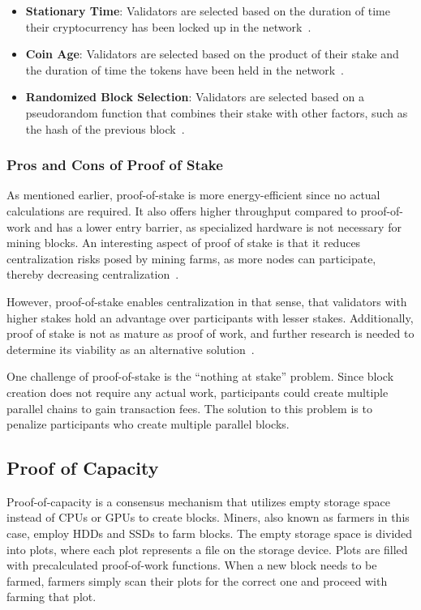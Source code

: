 \begin{itemize}
    \item \textbf{Stationary Time}: Validators are selected based on the duration of time their cryptocurrency has been locked up in the network~\cite{bitpanda-pos}.
    \item \textbf{Coin Age}: Validators are selected based on the product of their stake and the duration of time the tokens have been held in the network~\cite{bitflyer-glossary}.
    \item \textbf{Randomized Block Selection}: Validators are selected based on a pseudorandom function that combines their stake with other factors, such as the hash of the previous block~\cite{cryptonews-pos}.
\end{itemize}

\subsubsection{Pros and Cons of Proof of Stake}
As mentioned earlier, proof-of-stake is more energy-efficient since no actual calculations are required.
It also offers higher throughput compared to proof-of-work and has a lower entry barrier, as specialized hardware is not necessary for mining blocks.
An interesting aspect of proof of stake is that it reduces centralization risks posed by mining farms, as more nodes can participate, thereby decreasing centralization~\cite{bitpanda-pos}.

However, proof-of-stake enables centralization in that sense, that validators with higher stakes hold an advantage over participants with lesser stakes.
Additionally, proof of stake is not as mature as proof of work, and further research is needed to determine its viability as an alternative solution~\cite{insider-pos-vs-pow}.

One challenge of proof-of-stake is the ``nothing at stake'' problem.
Since block creation does not require any actual work, participants could create multiple parallel chains to gain transaction fees.
The solution to this problem is to penalize participants who create multiple parallel blocks.

\subsection{Proof of Capacity}\label{subsec:proof-of-capacity}
Proof-of-capacity is a consensus mechanism that utilizes empty storage space instead of CPUs or GPUs to create blocks.
Miners, also known as farmers in this case, employ HDDs and SSDs to farm blocks.
The empty storage space is divided into plots, where each plot represents a file on the storage device.
Plots are filled with precalculated proof-of-work functions.
When a new block needs to be farmed, farmers simply scan their plots for the correct one and proceed with farming that plot.

